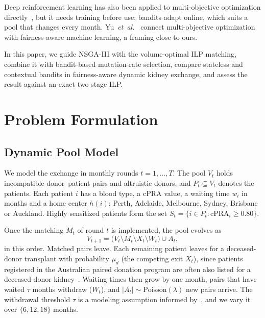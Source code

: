 \documentclass[journal]{IEEEtran}
\newcommand{\cpra}{\ensuremath{\mathrm{cPRA}}}
\begin{document}
Deep reinforcement learning has also been applied to multi-objective
optimization directly~\cite{li2021deeprl}, but it needs training before
use; bandits adapt online, which suits a pool that changes every month.
Yu~\textit{et~al.}~\cite{yu2025fairness} connect multi-objective
optimization with fairness-aware machine learning, a framing close to
ours.

In this paper, we guide NSGA-III with the volume-optimal ILP matching,
combine it with bandit-based mutation-rate selection, compare
stateless and contextual bandits in fairness-aware dynamic kidney
exchange, and assess the result against an exact two-stage ILP.

\section{Problem Formulation}
\label{sec:problem}

\subsection{Dynamic Pool Model}
\label{sec:problem:model}

We model the exchange in monthly rounds $t = 1,\dots,T$. The pool
$V_t$ holds incompatible donor--patient pairs and altruistic donors,
and $P_t \subseteq V_t$ denotes the patients. Each patient $i$ has a
blood type, a cPRA value, a waiting time $w_i$ in months and a home
center $h(i)$: Perth, Adelaide, Melbourne, Sydney, Brisbane or
Auckland. Highly sensitized patients form the set
$S_t = \{ i \in P_t : \cpra_i \geq 0.80 \}$.

Once the matching $M_t$ of round $t$ is implemented, the pool evolves
as
\begin{equation}
  V_{t+1} = \bigl(V_t \setminus M_t \setminus X_t \setminus W_t\bigr)
            \cup A_t ,
  \label{eq:pool}
\end{equation}
in this order. Matched pairs leave. Each remaining patient leaves for
a deceased-donor transplant with probability $\mu_d$ (the competing
exit $X_t$), since patients registered in the Australian paired
donation program are often also listed for a deceased-donor
kidney~\cite{Ferrari2012}. Waiting times then grow by one month, pairs that have
waited $\tau$ months withdraw ($W_t$), and
$|A_t| \sim \mathrm{Poisson}(\lambda)$ new pairs arrive. The
withdrawal threshold $\tau$ is a modeling assumption informed
by~\cite{Ferrari2012}, and we vary it over $\{6, 12, 18\}$ months.
\end{document}

